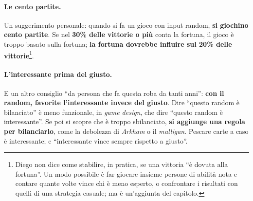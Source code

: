 \paragraph{Le cento partite.} Un suggerimento personale: quando si fa un gioco con input
random, \textbf{si giochino cento partite}. Se nel \textbf{30\% delle vittorie o più} conta la
fortuna, il gioco è troppo basato sulla fortuna; \textbf{la fortuna dovrebbe influire sul
20\% delle vittorie}\footnote{Diego non dice come stabilire, in pratica, se una vittoria
``è dovuta alla fortuna''. Un modo possibile è far giocare insieme persone di abilità nota e
contare quante volte vince chi è meno esperto, o confrontare i risultati con quelli di una
strategia casuale; ma è un'aggiunta del capitolo.}.

\paragraph{L'interessante prima del giusto.} E un altro consiglio ``da persona che fa questa
roba da tanti anni'': \textbf{con il random, favorite l'interessante invece del giusto}. Dire
``questo random è bilanciato'' è meno funzionale, in \emph{game design}, che dire ``questo
random è interessante''. Se poi si scopre che è troppo sbilanciato, \textbf{si aggiunge una
regola per bilanciarlo}, come la debolezza di \emph{Arkham} o il \emph{mulligan}. Pescare
carte a caso è interessante; e ``interessante vince sempre rispetto a giusto''.

